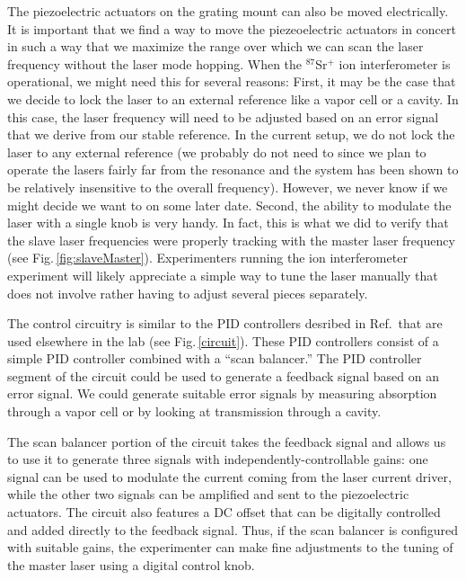 The piezoelectric actuators on the grating mount can also be moved electrically. It is important that we find a way to move the piezeoelectric actuators in concert in such a way that we maximize the range over which we can scan the laser frequency without the laser mode hopping. When the $^{87}$Sr$^+$ ion interferometer is operational, we might need this for several reasons: First, it may be the case that we decide to lock the laser to an external reference like a vapor cell or a cavity. In this case, the laser frequency will need to be adjusted based on an error signal that we derive from our stable reference. In the current setup, we do not lock the laser to any external reference (we probably do not need to since we plan to operate the lasers fairly far from the resonance and the system has been shown to be relatively insensitive to the overall frequency). However, we never know if we might decide we want to on some later date. Second, the ability to modulate the laser with a single knob is very handy. In fact, this is what we did to verify that the slave laser frequencies were properly tracking with the master laser frequency (see Fig.\,\ref{fig:slaveMaster}). Experimenters running the ion interferometer experiment will likely appreciate a simple way to tune the laser manually that does not involve rather having to adjust several pieces separately. 


The control circuitry is similar to the PID controllers desribed in Ref.\,\cite{cjeDiss} that are used elsewhere in the lab (see Fig.\,\ref{circuit}). These PID controllers consist of a simple PID controller combined with a ``scan balancer.'' The PID controller segment of the circuit could be used to generate a feedback signal based on an error signal. We could generate suitable error signals by measuring absorption through a vapor cell or by looking at transmission through a cavity. 

The scan balancer portion of the circuit takes the feedback signal and allows us to use it to generate three signals with independently-controllable gains: one signal can be used to modulate the current coming from the laser current driver, while the other two signals can be amplified and sent to the piezoelectric actuators. The circuit also features a DC offset that can be digitally controlled and added directly to the feedback signal. Thus, if the scan balancer is configured with suitable gains, the experimenter can make fine adjustments to the tuning of the master laser using a digital control knob.

